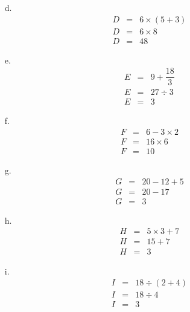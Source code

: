 \documentclass[12pt]{article}
\begin{document}
\begin{multicols}{3}

  \begin{enumerate}
\item[d.] \begin{eqnarray*}
  D &=& 6 \times (5 + 3) \\
  D &=& 6 \times 8       \\
  D &=& 48
\end{eqnarray*}

\item[e.] \begin{eqnarray*}
  E &=& 9 + \dfrac{18}{3}\\
  E &=& 27 \div 3        \\
  E &=& 3
\end{eqnarray*}

\item[f.] \begin{eqnarray*}
  F &=& 6 - 3 \times 2 \\
  F &=& 16 \times 6    \\
  F &=& 10
\end{eqnarray*}
\end{enumerate}
\end{multicols}
\begin{multicols}{3}
  \begin{enumerate}
\item[g.] \begin{eqnarray*}
  G &=& 20 - 12 + 5 \\
  G &=& 20 - 17     \\
  G &=& 3 
\end{eqnarray*}

\item[h.] \begin{eqnarray*}
  H &=& 5 \times 3 + 7 \\
  H &=& 15 + 7         \\
  H &=& 3
\end{eqnarray*}

\item[i.] \begin{eqnarray*}
  I &=& 18 \div (2 + 4) \\
  I &=& 18 \div 4       \\
  I &=& 3
\end{eqnarray*}


\end{enumerate}

\end{multicols}
\end{document}
